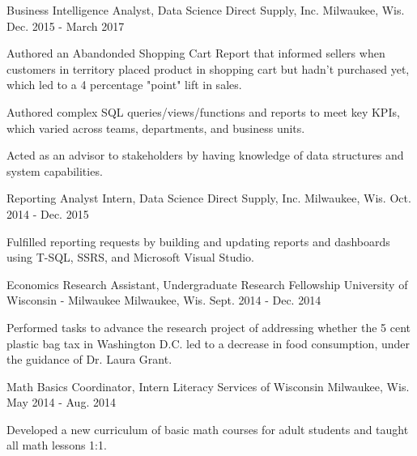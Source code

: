 \begin{cventries}
  \cventry
    {Business Intelligence Analyst, Data Science} %
    {Direct Supply, Inc.} %
    {Milwaukee, Wis.} %
    {Dec. 2015 - March 2017} %
    {
      \begin{cvitems} %
        \item {Authored an Abandonded Shopping Cart Report that informed sellers when customers in territory placed product in shopping cart but hadn't purchased yet, which led to a 4 percentage "point" lift in sales.}
        \item {Authored complex SQL queries/views/functions and reports to meet key KPIs, which varied across teams, departments, and business units.}
        \item {Acted as an advisor to stakeholders by having knowledge of data structures and system capabilities.}
      \end{cvitems}
    }

  \cventry
    {Reporting Analyst Intern, Data Science} %
    {Direct Supply, Inc.} %
    {Milwaukee, Wis.} %
    {Oct. 2014 - Dec. 2015} %
    {
      \begin{cvitems} %
        \item {Fulfilled reporting requests by building and updating reports and dashboards using T-SQL, SSRS, and Microsoft Visual Studio.}
      \end{cvitems}
    }

  \cventry
    {Economics Research Assistant, Undergraduate Research Fellowship} %
    {University of Wisconsin - Milwaukee} %
    {Milwaukee, Wis.} %
    {Sept. 2014 - Dec. 2014} %
    {
      \begin{cvitems} %
        \item {Performed tasks to advance the research project of addressing whether the 5 cent plastic bag tax in Washington D.C. led to a decrease in food consumption, under the guidance of Dr. Laura Grant.}
      \end{cvitems}
    }

  \cventry
    {Math Basics Coordinator, Intern} %
    {Literacy Services of Wisconsin} %
    {Milwaukee, Wis.} %
    {May 2014 - Aug. 2014} %
    {
      \begin{cvitems} %
        \item {Developed a new curriculum of basic math courses for adult students and taught all math lessons 1:1.}
      \end{cvitems}
    }
\end{cventries}